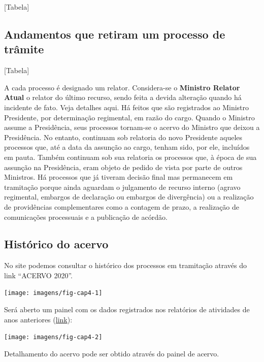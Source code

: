 \documentclass[
]{book}
\begin{document}
{[}Tabela{]}

\hypertarget{andamentos-que-retiram-um-processo-de-truxe2mite}{%
\subsection{Andamentos que retiram um processo de trâmite}\label{andamentos-que-retiram-um-processo-de-truxe2mite}}

{[}Tabela{]}

A cada processo é designado um relator. Considera-se o \textbf{Ministro Relator Atual} o relator do último recurso, sendo feita a devida alteração quando há incidente de fato. Veja detalhes aqui.
Há feitos que são registrados ao Ministro Presidente, por determinação regimental, em razão do cargo. Quando o Ministro assume a Presidência, seus processos tornam-se o acervo do Ministro que deixou a Presidência. No entanto, continuam sob relatoria do novo Presidente aqueles processos que, até a data da assunção ao cargo, tenham sido, por ele, incluídos em pauta. Também continuam sob sua relatoria os processos que, à época de sua assunção na Presidência, eram objeto de pedido de vista por parte de outros Ministros.
Há processos que já tiveram decisão final mas permanecem em tramitação porque ainda aguardam o julgamento de recurso interno (agravo regimental, embargos de declaração ou embargos de divergência) ou a realização de providências complementares como a contagem de prazo, a realização de comunicações processuais e a publicação de acórdão.

\hypertarget{histuxf3rico-do-acervo}{%
\subsection{Histórico do acervo}\label{histuxf3rico-do-acervo}}

No site podemos consultar o histórico dos processos em tramitação através do link ``ACERVO 2020''.

\texttt{[image: imagens/fig-cap4-1]}

Será aberto um painel com os dados registrados nos relatórios de atividades de anos anteriores (\href{https://transparencia.stf.jus.br/single/?appid=e554950b-d244-487b-991d-abcc693bfa7c\&sheet=ea8942c2-79fa-494f-bf18-ca6d5a3bfb43\&theme=simplicity\&opt=currsel\&select=clearall}{link}):

\texttt{[image: imagens/fig-cap4-2]}

Detalhamento do acervo pode ser obtido através do painel de acervo.
\end{document}
